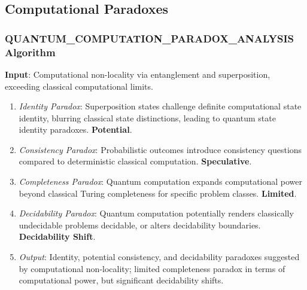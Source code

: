 	
	\subsection{Computational Paradoxes}
	
	\subsubsection{QUANTUM\_COMPUTATION\_PARADOX\_ANALYSIS Algorithm}
	\textbf{Input}: Computational non-locality via entanglement and superposition, exceeding classical computational limits.
	\begin{enumerate}
		\item \textit{Identity Paradox}: Superposition states challenge definite computational state identity, blurring classical state distinctions, leading to quantum state identity paradoxes. \textbf{Potential}.
		\item \textit{Consistency Paradox}: Probabilistic outcomes introduce consistency questions compared to deterministic classical computation. \textbf{Speculative}.
		\item \textit{Completeness Paradox}: Quantum computation expands computational power beyond classical Turing completeness for specific problem classes. \textbf{Limited}.
		\item \textit{Decidability Paradox}: Quantum computation potentially renders classically undecidable problems decidable, or alters decidability boundaries. \textbf{Decidability Shift}.
		\item \textit{Output}: Identity, potential consistency, and decidability paradoxes suggested by computational non-locality; limited completeness paradox in terms of computational power, but significant decidability shifts.
	\end{enumerate}
	
	
